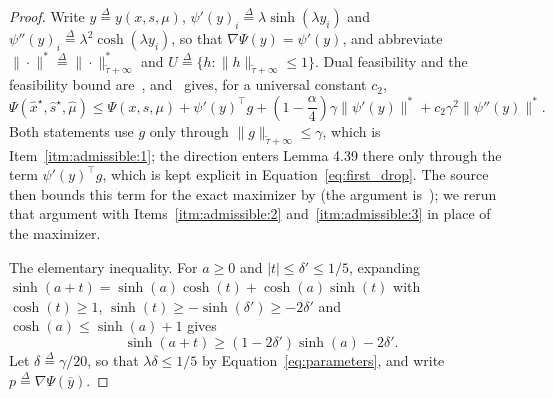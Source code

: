\documentclass[11pt]{article}
\newcommand{\xhat}{\widehat{x}}
\newcommand{\shat}{\widehat{s}}
\newcommand{\muhat}{\widehat{\mu}}
\newcommand{\tautil}{\widetilde{\tau}}
\newcommand{\defeq}{\stackrel{\Delta}{=}}
\begin{document}
\begin{proof}
Write $y \defeq y(x, s, \mu)$,
$\psi'(y)_i \defeq \lambda \sinh(\lambda y_i)$ and
$\psi''(y)_i \defeq \lambda^{2} \cosh(\lambda y_i)$, so that
$\nabla \Psi(y) = \psi'(y)$, and abbreviate
$\|\cdot\|^{*} \defeq \|\cdot\|^{*}_{\tautil + \infty}$ and
$U \defeq \{ h : \|h\|_{\tautil + \infty} \le 1 \}$.
Dual feasibility and the feasibility bound are~\cite[Lemma
4.38]{BLLSSSW21}, and~\cite[Lemma
4.39]{BLLSSSW21} gives, for a universal
constant $c_{2}$,
\begin{equation}
\label{eq:first_drop}
\Psi(\xhat^{\star}, \shat^{\star}, \muhat)
\le
\Psi(x, s, \mu)
+ \psi'(y)^\top g
+ \left( 1 - \frac{\alpha}{4} \right) \gamma \|\psi'(y)\|^{*}
+ c_{2} \gamma^{2} \|\psi''(y)\|^{*} .
\end{equation}
Both statements use $g$ only through
$\|g\|_{\tautil + \infty} \le \gamma$, which is Item~\ref{itm:admissible:1}; the
direction enters Lemma 4.39 there only through the term $\psi'(y)^\top g$, which
is kept explicit in Equation~\eqref{eq:first_drop}.
The source then bounds this term for the exact maximizer by \cite[Lemma
4.36]{BLNPSSSW20} (the argument
is~\cite[Corollary 4.40]{BLLSSSW21}); we rerun
that argument with Items~\ref{itm:admissible:2} and~\ref{itm:admissible:3} in
place of the maximizer.

The elementary inequality.
For $a \ge 0$ and
$|t| \le \delta' \le 1 / 5$, expanding
$\sinh(a + t) = \sinh(a) \cosh(t) + \cosh(a) \sinh(t)$ with
$\cosh(t) \ge 1$,
$\sinh(t) \ge - \sinh(\delta') \ge - 2 \delta'$ and
$\cosh(a) \le \sinh(a) + 1$ gives
\begin{equation}
\label{eq:sinh_shift}
\sinh(a + t)
\ge
\left( 1 - 2 \delta' \right) \sinh(a) - 2 \delta' .
\end{equation}
Let $\delta \defeq \gamma / 20$, so that
$\lambda \delta \le 1 / 5$ by Equation~\eqref{eq:parameters}, and write
$p \defeq \nabla \Psi(\overline{y})$.


\end{proof}
\end{document}
